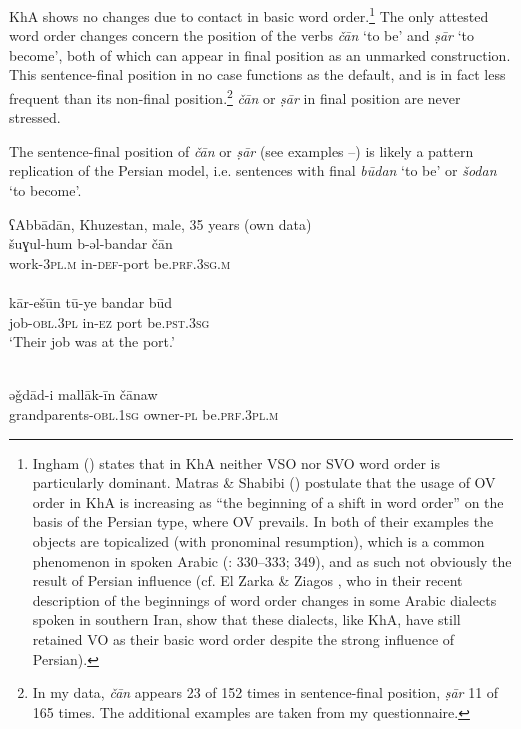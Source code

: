 \documentclass[output=paper,nonflat]{langsci/langscibook}
\begin{document}
KhA shows no changes due to contact in basic word order.\footnote{Ingham (\citeyear[715]{Ingham1991}) states that in KhA neither VSO nor SVO word order is particularly dominant. Matras \& Shabibi (\citeyear[147]{MatrasShabibi2007}) postulate that the usage of OV order in KhA is increasing as “the beginning of a shift in word order” on the basis of the Persian type, where OV prevails. In both of their examples the objects are topicalized (with pronominal resumption), which is a common phenomenon in spoken Arabic (\citealt{Brustad2000}: 330–333; 349), and as such not obviously the result of Persian influence (cf. El Zarka \& Ziagos \citeyear{ElZarkaZiagos2019}, who in their recent description of the beginnings of word order changes in some Arabic dialects spoken in southern Iran, show that these dialects, like KhA, have still retained VO as their basic word order despite the strong influence of Persian).}  The only attested word order changes concern the position of the verbs \textit{čān} ‘to be’ and \textit{ṣār} ‘to become’, both of which can appear in final position as an unmarked construction. This sentence-final position in no case functions as the default, and is in fact less frequent than its non-final position.\footnote{In my data, \textit{čān} appears 23 of 152 times in sentence-final position, \textit{ṣār} 11 of 165 times. The additional examples are taken from my questionnaire.} \textit{čān} or \textit{ṣār} in final position are never stressed.

The sentence-final position of \textit{čān} or \textit{ṣār} (see examples --) is likely a pattern replication of the Persian model, i.e. sentences with final \textit{būdan} ‘to be’ or \textit{šodan} ‘to become’.

\ea\label{port}
\ea
{ʕAbbādān, Khuzestan, male, 35 years (own data)}\\
\gll šuɣul-hum b-əl-bandar čān\\
     work-\textsc{3pl}.\textsc{m} in-\textsc{def}-port be.\textsc{prf.3sg.m}\\
 
\\
\gll kār-ešūn tū-ye bandar būd\\
     job-\textsc{obl}.3\textsc{pl} in-\textsc{ez} port be.\textsc{pst.3sg}\\
\glt ‘Their job was at the port.’
\z\z

\ea
{}\\
\gll əǧdād-i mallāk-īn čānaw\\
     grandparents-\textsc{obl.1sg} owner-\textsc{pl} be.\textsc{prf.3pl.m}\\
 
\end{document}
